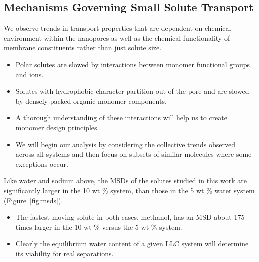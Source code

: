 \documentclass{article}
\begin{document}
  \subsection*{Mechanisms Governing Small Solute Transport}\label{section:mechanism_overview}
  
  We observe trends in transport properties that are dependent on chemical 
  environment within the nanopores as well as the chemical functionality of membrane
  constituents rather than just solute size. 
  \begin{itemize}
    \item Polar solutes are slowed by interactions between monomer functional groups
    and ions.
    \item Solutes with hydrophobic character partition out of the pore and are 
    slowed by densely packed organic monomer components.
    \item A thorough understanding of these interactions will help us to create
    monomer design principles.
    \item We will begin our analysis by considering the collective trends observed  
    across all systems and then focus on subsets of similar molecules where 
    some exceptions occur. 
  \end{itemize}
  
  
  Like water and sodium above, the MSDs of the solutes studied in this work are 
  significantly larger in the 10 wt \% system, than those in the 5 wt \% water 
  system (Figure~\ref{fig:msds}). 
  \begin{itemize}
    \item The fastest moving solute in both cases, methanol, has an MSD about 175
    times larger in the 10 wt \% versus the 5 wt \% system.
    \item Clearly the equilibrium water content of a given LLC system will 
    determine its viability for real separations.
  \end{itemize} 
  
  
\end{document}
